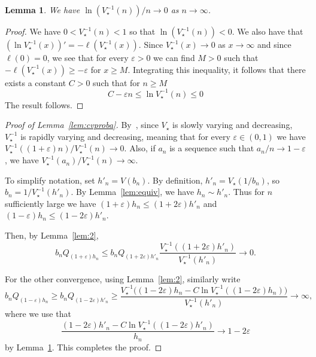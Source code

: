 \documentclass[10pt]{amsart}
\newtheorem{lemm}[theo]{Lemma}\newtheorem{prop}[theo]{Proposition}\newtheorem{coro}[theo]{Corollary}\newtheorem{conj}[theo]{Conjecture}
\theoremstyle{definition}\newtheorem{defi}[theo]{Definition}\newtheorem{rema}[theo]{Remark}\newtheorem{exam}[theo]{Example}\newtheorem{exem}[theo]{Example}\newtheorem{nota}[theo]{Notation}
\newcommand*{\MK}{\mkern 2mu}
\begin{document}
\begin{lemm}\label{lem:3}
We have $\ln(V_{\star}^{-1}(n))/n \rightarrow 0$ as $ n \rightarrow \infty$.
\end{lemm}

\begin{proof}
We have $0<V_{\star}^{-1}(n)<1$ so that $\ln(V_{\star}^{-1}(n))<0$. We also have that $(\ln V_{\star}^{-1}(x))'=-\ell(V_{\star}^{-1}(x))$. Since $V_{\star}^{-1}(x) \rightarrow 0$ as $x \rightarrow \infty$ and since $\ell(0)=0$, we see that for every $\varepsilon>0$ we can find $M>0$ such that $-\ell(V_{\star}^{-1}(x)) \geq -\varepsilon$ for $x \geq M$. Integrating this inequality, it follows that there exists a constant $C>0$ such that for $n \geq M$
\[
C -\varepsilon n \leq \ln V_{\star}^{-1}(n) \leq 0
\]
The result follows.
\end{proof}


\begin{proof}[Proof of Lemma~\ref{lem:cvproba}]
By~\cite[Theorem~2.4.7$\MK$(i) and Eq.~(2.4.3)]{BGT89}, since $V_{\star}$ is slowly varying and decreasing, $V_{\star}^{-1}$ is rapidly varying and decreasing, meaning that for every $\varepsilon \in (0,1)$ we have $V_{\star}^{-1}((1+\varepsilon) n)/V_{\star}^{-1}(n) \rightarrow 0$. Also, if $a_{n}$ is a sequence such that $a_{n}/n \rightarrow 1-\varepsilon$, we have $V_{\star}^{-1}(a_{n })/V_{\star}^{-1}(n) \rightarrow \infty$.

To simplify notation, set $h'_{n}=V(b_{n})$. By definition, $h'_{n}=V_{\star}(1/b_n)$, so $b_n=1/V_{\star}^{-1}(h'_{n})$. By Lemma~\ref{lem:equiv}, we have $h_n \sim h'_{n}$. Thus for $n$ sufficiently large we have $ (1+\varepsilon) h_{n} \leq (1+2\varepsilon) h'_{n}$ and$ (1-\varepsilon) h_{n} \leq (1-2\varepsilon) h'_{n}$.



Then, by Lemma~\ref{lem:2},
\[
b_{n} Q_{(1+\varepsilon)h_{n}} \leq b_{n} Q_{(1+2\varepsilon)h'_{n}} \frac{V_{\star}^{-1}((1+2\varepsilon)h'_{n})}{V_{\star}^{-1}(h'_{n})}  \longrightarrow 0.
\]

For the other convergence, using Lemma~\ref{lem:2}, similarly write
\[
b_{n} Q_{(1-\varepsilon)h_{n}} \geq b_{n} Q_{(1-2\varepsilon)h'_{n}} \geq \frac{V_{\star}^{-1}\big((1-2\varepsilon)h_{n} - C \ln V_{\star}^{-1}((1-2\varepsilon)h_{n})\big)}{V_{\star}^{-1}(h'_{n})}  \longrightarrow \infty,
\]
where we use that
\[
\frac{ (1-2\varepsilon)h'_{n} - C \ln V_{\star}^{-1}((1-2\varepsilon)h'_{n})}{h_n} \to 1-2\varepsilon
\]
by Lemma~\ref{lem:3}. This completes the proof.
\end{proof}
\end{document}
